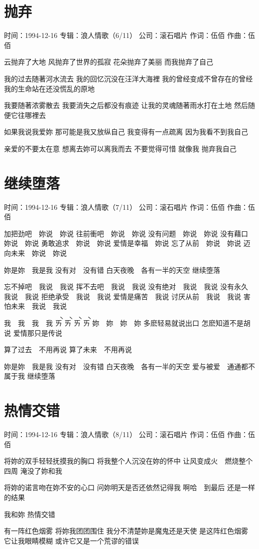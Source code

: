 \documentclass[UTF8,a4paper,oneside,twocolumn,12pt]{ctexbook}
\newcommand{\infopair}[2]{\textbullet #1：#2}
\newcommand{\zc}[1][伍佰]{\infopair{作词}{#1}}
\newcommand{\zq}[1][伍佰]{\infopair{作曲}{#1}}
\newcommand{\zj}[1]{\infopair{专辑}{#1}}
\newcommand{\sj}[1]{\infopair{时间}{#1}}
\newcommand{\gs}[1]{\infopair{公司}{#1}}
\newenvironment{info}{\begin{flushleft}\kaishu
	}
	{\end{flushleft}\normalsize\yahei\par}
\newenvironment{lyric}{
	}
{}
\begin{document}
\section{抛弃}
\begin{info}
	\sj{1994-12-16}
	\zj{浪人情歌（6/11）}
	\gs{滚石唱片}
	\zc
	\zq
\end{info}
\begin{lyric}
	云抛弃了大地
	风抛弃了世界的孤寂
	花朵抛弃了美丽
	而我抛弃了自己

	我的过去随著河水流去
	我的回忆沉没在汪洋大海裡
	我的曾经变成不曾存在的曾经
	我的生命站在还没慌乱的原地

	我要随著浓雾散去
	我要消失之后都没有痕迹
	让我的灵魂随著雨水打在土地
	然后随便它往哪裡去

	如果我说我爱妳
	那可能是我又放纵自己
	我变得有一点疏离
	因为我看不到我自己

	亲爱的不要太在意
	想离去妳可以离我而去
	不要觉得可惜
	就像我 抛弃我自己
\end{lyric}

\section{继续堕落}
\begin{info}
	\sj{1994-12-16}
	\zj{浪人情歌（7/11）}
	\gs{滚石唱片}
	\zc
	\zq
\end{info}
\begin{lyric}
	加把劲吧　妳说　妳说
	往前衝吧　妳说　妳说
	没有问题　妳说　妳说
	没有藉口　妳说　妳说
	勇敢追求　妳说　妳说
	爱情是幸福　妳说
	忘了从前　妳说　妳说
	迈向未来　妳说　妳说

	妳是妳　我是我
	没有对　没有错
	白天夜晚　各有一半的天空
	继续堕落

	忘不掉吧　我说　我说
	挥不去吧　我说　我说
	没有绝对　我说　我说
	没有永久　我说　我说
	拒绝承受　我说　我说
	爱情是痛苦　我说
	讨厌从前　我说　我说
	害怕未来　我说　我说

	我　我　我　我
	\`ㄞ \`ㄞ \`ㄞ \`ㄞ
	妳　妳　妳　妳
	多麽轻易就说出口
	怎麽知道不是胡说
	爱情那只是传说

	算了过去　不用再说
	算了未来　不用再说

	妳是妳　我是我
	没有对　没有错
	白天夜晚　各有一半的天空
	爱与被爱　通通都不属于我
	继续堕落
\end{lyric}

\section{热情交错}
\begin{info}
	\sj{1994-12-16}
	\zj{浪人情歌（8/11）}
	\gs{滚石唱片}
	\zc
	\zq
\end{info}
\begin{lyric}
	将妳的双手轻轻抚摸我的胸口
	将我整个人沉没在妳的怀中
	让风变成火　燃烧整个四周
	淹没了妳和我

	将妳的诺言吻在妳不安的心口
	问妳明天是否还依然记得我
	啊哈　到最后
	还是一样的结果

	我和妳
	热情交错

	有一阵红色烟雾
	将妳我团团围住
	我分不清楚妳是魔鬼还是天使
	是这阵红色烟雾
	它让我眼睛模糊
	或许它又是一个荒谬的错误
\end{lyric}
\end{document}
